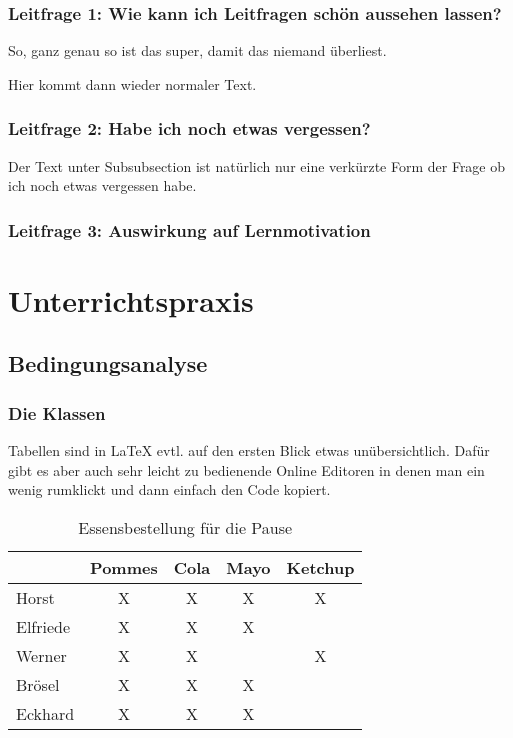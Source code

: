 	\subsubsection{Leitfrage 1: Wie kann ich Leitfragen schön aussehen lassen?}
	\begin{tcolorbox}
		So, ganz genau so ist das super, damit das niemand überliest.
	\end{tcolorbox}
	Hier kommt dann wieder normaler Text.
	
	\subsubsection{Leitfrage 2: Habe ich noch etwas vergessen?}
	\begin{tcolorbox}
		Der Text unter Subsubsection ist natürlich nur eine verkürzte Form der Frage ob ich noch etwas vergessen habe.
	\end{tcolorbox}
	
	\subsubsection{Leitfrage 3: Auswirkung auf Lernmotivation}
	
	\newpage
	\section{Unterrichtspraxis}
	\subsection{Bedingungsanalyse}
	\subsubsection{Die Klassen}
	
	Tabellen sind in \LaTeX{} evtl. auf den ersten Blick etwas unübersichtlich. Dafür gibt es aber auch sehr leicht zu bedienende Online Editoren in denen man ein wenig rumklickt und dann einfach den Code kopiert.
	
	\begin{table}[hbtp]
		\centering
		\begin{tabular}{l|c|c|c|c|}
			\cline{2-5}
			& Pommes  & Cola   & Mayo    & Ketchup \\ \hline
			\multicolumn{1}{|l|}{Horst}     & X       & X      & X       & X       \\ \hline
			\multicolumn{1}{|l|}{Elfriede}  & X       & X      & X       &         \\ \hline
			\multicolumn{1}{|l|}{Werner}    & X       & X      &         & X       \\ \hline
			\multicolumn{1}{|l|}{Brösel}    & X       & X      & X       &         \\ \hline
			\multicolumn{1}{|l|}{Eckhard}   & X       & X      & X       &         \\ \hline
		\end{tabular}
		\caption{Essensbestellung für die Pause}
		\label{tab:essen}
	\end{table}
	
